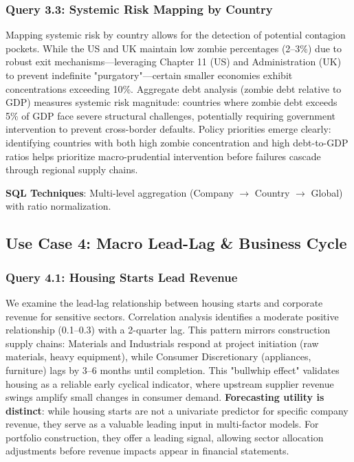 \documentclass[10pt,a4paper]{article}
\begin{document}
\subsubsection{Query 3.3: Systemic Risk Mapping by Country}
Mapping systemic risk by country allows for the detection of potential contagion pockets. While the US and UK maintain low zombie percentages (2--3\%) due to robust exit mechanisms—leveraging Chapter 11 (US) and Administration (UK) to prevent indefinite "purgatory"—certain smaller economies exhibit concentrations exceeding 10\%. Aggregate debt analysis (zombie debt relative to GDP) measures systemic risk magnitude: countries where zombie debt exceeds 5\% of GDP face severe structural challenges, potentially requiring government intervention to prevent cross-border defaults. Policy priorities emerge clearly: identifying countries with both high zombie concentration and high debt-to-GDP ratios helps prioritize macro-prudential intervention before failures cascade through regional supply chains.

\textbf{SQL Techniques}: Multi-level aggregation (Company $\to$ Country $\to$ Global) with ratio normalization.


\subsection{Use Case 4: Macro Lead-Lag \& Business Cycle}

\subsubsection{Query 4.1: Housing Starts Lead Revenue}
We examine the lead-lag relationship between housing starts and corporate revenue for sensitive sectors. Correlation analysis identifies a moderate positive relationship (0.1--0.3) with a 2-quarter lag. This pattern mirrors construction supply chains: Materials and Industrials respond at project initiation (raw materials, heavy equipment), while Consumer Discretionary (appliances, furniture) lags by 3--6 months until completion. This "bullwhip effect" \cite{harvey1989} validates housing as a reliable early cyclical indicator, where upstream supplier revenue swings amplify small changes in consumer demand. \textbf{Forecasting utility is distinct}: while housing starts are not a univariate predictor for specific company revenue, they serve as a valuable leading input in multi-factor models. For portfolio construction, they offer a leading signal, allowing sector allocation adjustments before revenue impacts appear in financial statements.
\end{document}
